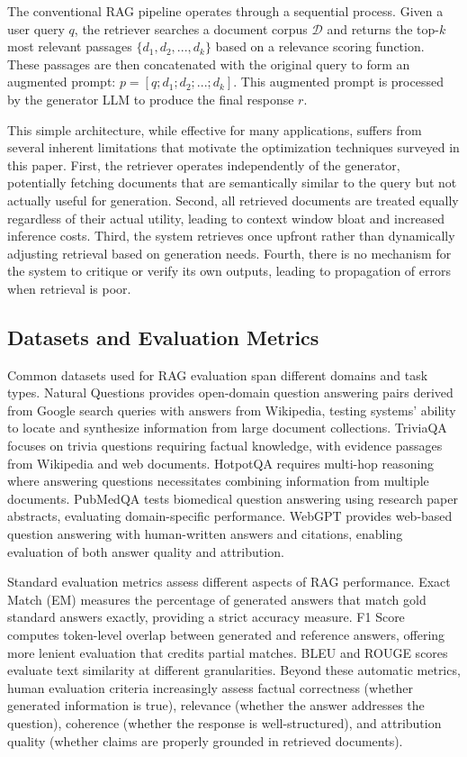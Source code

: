 \documentclass[11pt]{article}
\begin{document}
The conventional RAG pipeline operates through a sequential process. Given a user query $q$, the retriever searches a document corpus $\mathcal{D}$ and returns the top-$k$ most relevant passages $\{d_1, d_2, ..., d_k\}$ based on a relevance scoring function. These passages are then concatenated with the original query to form an augmented prompt: $p = [q; d_1; d_2; ...; d_k]$. This augmented prompt is processed by the generator LLM to produce the final response $r$.

This simple architecture, while effective for many applications, suffers from several inherent limitations that motivate the optimization techniques surveyed in this paper. First, the retriever operates independently of the generator, potentially fetching documents that are semantically similar to the query but not actually useful for generation. Second, all retrieved documents are treated equally regardless of their actual utility, leading to context window bloat and increased inference costs. Third, the system retrieves once upfront rather than dynamically adjusting retrieval based on generation needs. Fourth, there is no mechanism for the system to critique or verify its own outputs, leading to propagation of errors when retrieval is poor.

\subsection{Datasets and Evaluation Metrics}

Common datasets used for RAG evaluation span different domains and task types. Natural Questions provides open-domain question answering pairs derived from Google search queries with answers from Wikipedia, testing systems' ability to locate and synthesize information from large document collections. TriviaQA focuses on trivia questions requiring factual knowledge, with evidence passages from Wikipedia and web documents. HotpotQA requires multi-hop reasoning where answering questions necessitates combining information from multiple documents. PubMedQA tests biomedical question answering using research paper abstracts, evaluating domain-specific performance. WebGPT provides web-based question answering with human-written answers and citations, enabling evaluation of both answer quality and attribution.

Standard evaluation metrics assess different aspects of RAG performance. Exact Match (EM) measures the percentage of generated answers that match gold standard answers exactly, providing a strict accuracy measure. F1 Score computes token-level overlap between generated and reference answers, offering more lenient evaluation that credits partial matches. BLEU and ROUGE scores evaluate text similarity at different granularities. Beyond these automatic metrics, human evaluation criteria increasingly assess factual correctness (whether generated information is true), relevance (whether the answer addresses the question), coherence (whether the response is well-structured), and attribution quality (whether claims are properly grounded in retrieved documents).
\end{document}
